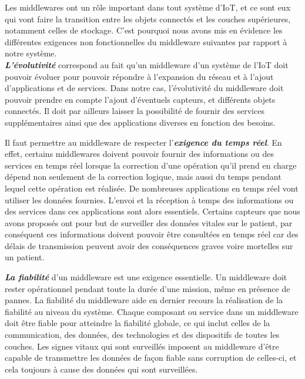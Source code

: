 Les middlewares ont un rôle important dans tout système d’IoT, et ce sont eux qui vont faire la transition entre les objets connectés et les couches supérieures, notamment celles de stockage. C’est pourquoi nous avons mis en évidence les différentes exigences non fonctionnelles du middleware suivantes par rapport à notre système.
\\

\textbf{\textit{L'évolutivité}} correspond au fait qu'un middleware d’un système de l’IoT doit pouvoir évoluer pour pouvoir répondre à l’expansion du réseau et à l’ajout d’applications et de services. Dans notre cas, l’évolutivité du middleware doit pouvoir prendre en compte l’ajout d’éventuels capteurs, et différents objets connectés. Il doit par ailleurs laisser la possibilité de fournir des services supplémentaires ainsi que des applications diverses en fonction des besoins.

Il faut permettre au middleware de respecter l'\textbf{\textit{exigence du temps réel}}. En effet, certains middlewares doivent pouvoir fournir des informations ou des services en temps réel lorsque la correction d'une opération qu’il prend en charge dépend non seulement de la correction logique, mais aussi du temps pendant lequel cette opération est réalisée. De nombreuses applications en temps réel vont utiliser les données fournies. L’envoi et la réception à temps des informations ou des services dans ces applications sont alors essentiels. Certains capteurs que nous avons proposés ont pour but de surveiller des données vitales sur le patient, par conséquent ces informations doivent pouvoir être consultées en temps réel car des délais de transmission peuvent avoir des conséquences graves voire mortelles sur un patient.

\textbf{\textit{La fiabilité}} d'un middleware est une exigence essentielle. Un middleware doit rester opérationnel pendant toute la durée d'une mission, même en présence de pannes. La fiabilité du middleware aide en dernier recours la réalisation de la fiabilité au niveau du système. Chaque composant ou service dans un middleware doit être fiable pour atteindre la fiabilité globale, ce qui inclut celles de la communication, des données, des technologies et des dispositifs de toutes les couches. Les signes vitaux qui sont surveillés imposent au middleware d’être capable de transmettre les données de façon fiable sans corruption de celles-ci, et cela toujours à cause des données qui sont surveillées.

